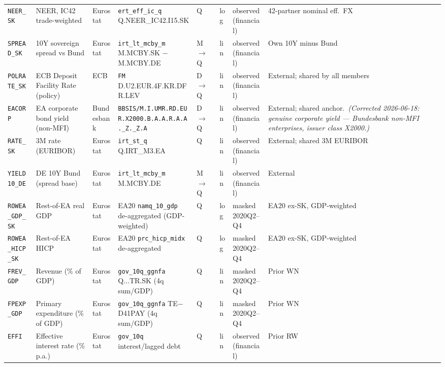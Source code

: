 {\begin{longtable}{@{}p{1.9cm}p{2.9cm}p{1.5cm}p{2.7cm}p{0.7cm}p{1.0cm}p{1.6cm}p{2.4cm}@{}}
\texttt{NEER\_SK}     & NEER, IC42 trade-weighted         & Eurostat & \texttt{ert\_eff\_ic\_q} Q.NEER\_IC42.I15.SK           & Q & log & observed (financial) & 42-partner nominal eff.\ FX \\
\texttt{SPREAD\_SK}   & 10Y sovereign spread vs Bund      & Eurostat & \texttt{irt\_lt\_mcby\_m} M.MCBY.SK $-$ M.MCBY.DE      & M$\to$Q & lin & observed (financial) & Own 10Y minus Bund \\
\texttt{POLRATE\_SK}  & ECB Deposit Facility Rate (policy) & ECB & \texttt{FM} D.\allowbreak U2.\allowbreak EUR.\allowbreak 4F.\allowbreak KR.\allowbreak DFR.\allowbreak LEV                     & D$\to$Q & lin & observed (financial) & External; shared by all members \\
\texttt{EACORP}       & EA corporate bond yield (non-MFI)  & Bundesbank & \texttt{BBSIS/\allowbreak M.\allowbreak I.\allowbreak UMR.\allowbreak RD.\allowbreak EUR.\allowbreak X2000.\allowbreak B.A.A.\allowbreak R.A.A.\allowbreak \_Z.\_Z.A}       & D$\to$Q & lin & observed (financial) & External; shared anchor.\ \textit{(Corrected 2026-06-18: genuine corporate yield --- Bundesbank non-MFI enterprises, issuer class X2000.)} \\
\texttt{RATE\_SK}     & 3M rate (EURIBOR)                 & Eurostat & \texttt{irt\_st\_q} Q.IRT\_M3.EA                       & Q & lin & observed (financial) & External; shared 3M EURIBOR \\
\texttt{YIELD10\_DE}  & DE 10Y Bund (spread base)         & Eurostat & \texttt{irt\_lt\_mcby\_m} M.MCBY.DE                    & M$\to$Q & lin & observed (financial) & External \\
\texttt{ROWEA\_GDP\_SK} & Rest-of-EA real GDP             & Eurostat & EA20 \texttt{namq\_10\_gdp} de-aggregated (GDP-weighted) & Q & log & masked 2020Q2--Q4 & EA20 ex-SK, GDP-weighted \\
\texttt{ROWEA\_HICP\_SK} & Rest-of-EA HICP               & Eurostat & EA20 \texttt{prc\_hicp\_midx} de-aggregated            & Q & log & masked 2020Q2--Q4 & EA20 ex-SK, GDP-weighted \\
\texttt{FREV\_GDP}    & Revenue (\% of GDP)               & Eurostat & \texttt{gov\_10q\_ggnfa} Q...TR.SK (4q sum/GDP)        & Q & lin & masked 2020Q2--Q4 & Prior WN \\
\texttt{FPEXP\_GDP}   & Primary expenditure (\% of GDP)   & Eurostat & \texttt{gov\_10q\_ggnfa} TE$-$D41PAY (4q sum/GDP)      & Q & lin & masked 2020Q2--Q4 & Prior WN \\
\texttt{EFFI}         & Effective interest rate (\% p.a.) & Eurostat & \texttt{gov\_10q} interest/lagged debt                 & Q & lin & observed (financial) & Prior RW \\

\end{longtable}}
